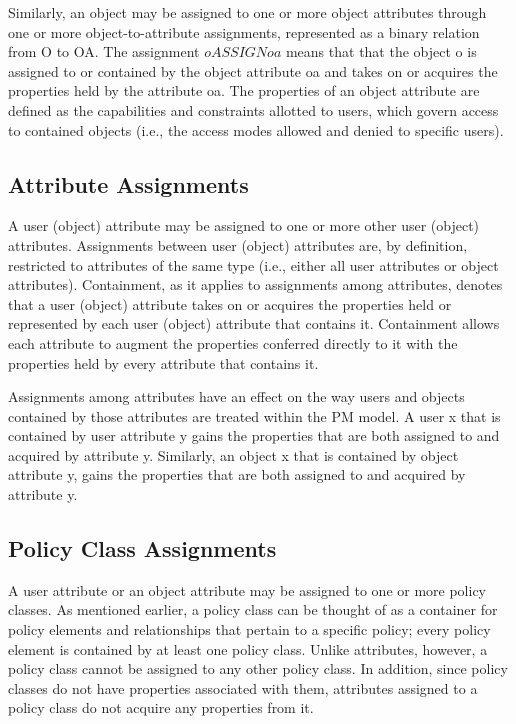 \documentclass[12pt,a4paper,titlepage]{book}
\begin{document}
		Similarly, an object may be assigned to one or more object attributes through one or more object-to-attribute assignments, represented as a binary relation from O to OA. The assignment $ o ASSIGN oa $ means that that the object o is assigned to or contained by the object attribute oa and takes on or acquires the properties held by the attribute oa. The properties of an object attribute are defined as the capabilities and constraints allotted to users, which govern access to contained objects (i.e., the access modes allowed and denied to specific users).
		
	\subsection{Attribute Assignments}
	
		A user (object) attribute may be assigned to one or more other user (object) attributes.
		Assignments between user (object) attributes are, by definition, restricted to attributes of the same type (i.e., either all user attributes or object attributes). Containment, as it applies to assignments among attributes, denotes that a user (object) attribute takes on or acquires the properties held or represented by each user (object) attribute that contains it. Containment allows each attribute to augment the properties conferred directly to it with the properties held by every attribute that contains it.
		
		Assignments among attributes have an effect on the way users and objects contained by those
		attributes are treated within the PM model. A user x that is contained by user attribute y gains the properties that are both assigned to and acquired by attribute y. Similarly, an object x that is contained by object attribute y, gains the properties that are both assigned to and acquired by attribute y.
		
	\subsection{Policy Class Assignments}
	
		A user attribute or an object attribute may be assigned to one or more policy classes. As
		mentioned earlier, a policy class can be thought of as a container for policy elements and
		relationships that pertain to a specific policy; every policy element is contained by at least one policy class. Unlike attributes, however, a policy class cannot be assigned to any other policy class. In addition, since policy classes do not have properties associated with them, attributes assigned to a policy class do not acquire any properties from it.
		
\end{document}

